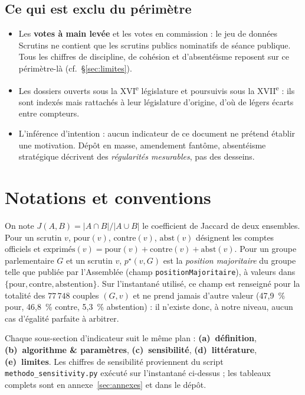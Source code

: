 \documentclass[11pt,a4paper]{article}
\newcommand{\code}[1]{\texttt{\small #1}}
\begin{document}
\subsection{Ce qui est exclu du périmètre}
\begin{itemize}
  \item Les \textbf{votes à main levée} et les votes en commission : le jeu de
        données \og{}Scrutins\fg{} ne contient que les scrutins publics nominatifs
        de séance publique. Tous les chiffres de discipline, de cohésion et
        d'absentéisme reposent sur ce périmètre-là (cf.~§\ref{sec:limites}).
  \item Les dossiers ouverts sous la XVI\textsuperscript{e} législature et
        poursuivis sous la XVII\textsuperscript{e} : ils sont indexés mais rattachés
        à leur législature d'origine, d'où de légers écarts entre compteurs.
  \item L'inférence d'intention : aucun indicateur de ce document ne prétend
        établir une motivation. \og{}Dépôt en masse\fg{}, \og{}amendement fantôme\fg{},
        \og{}absentéisme stratégique\fg{} décrivent des \emph{régularités mesurables},
        pas des desseins.
\end{itemize}

\section{Notations et conventions}\label{sec:notations}
On note $J(A,B) = |A\cap B| / |A\cup B|$ le coefficient de Jaccard de deux
ensembles. Pour un scrutin $v$, $\mathrm{pour}(v)$, $\mathrm{contre}(v)$,
$\mathrm{abst}(v)$ désignent les comptes officiels et
$\text{exprimés}(v)=\mathrm{pour}(v)+\mathrm{contre}(v)+\mathrm{abst}(v)$.
Pour un groupe parlementaire $G$ et un scrutin $v$, $p^\star(v,G)$ est la
\emph{position majoritaire} du groupe telle que publiée par l'Assemblée (champ
\code{positionMajoritaire}), à valeurs dans $\{\text{pour},\text{contre},\text{abstention}\}$.
Sur l'instantané utilisé, ce champ est renseigné pour la totalité des
$77\,748$ couples $(G,v)$ et ne prend jamais d'autre valeur (47,9~\% \og{}pour\fg{},
46,8~\% \og{}contre\fg{}, 5,3~\% \og{}abstention\fg{}) : il n'existe donc, à notre
niveau, aucun cas d'égalité parfaite à arbitrer.

Chaque sous-section d'indicateur suit le même plan : \textbf{(a)~définition},
\textbf{(b)~algorithme \& paramètres}, \textbf{(c)~sensibilité}, \textbf{(d)~littérature},
\textbf{(e)~limites}. Les chiffres de sensibilité proviennent du script
\code{methodo\_sensitivity.py} exécuté sur l'instantané ci-dessus ; les tableaux
complets sont en annexe~\ref{sec:annexes} et dans le dépôt.
\end{document}
